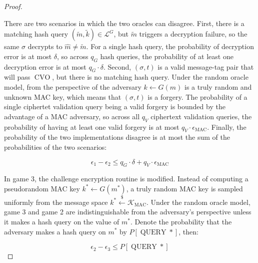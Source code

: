 \documentclass{article}
\newcommand{\leftsample}{\overset{{\scriptscriptstyle\$}}{\leftarrow}}
\newcommand{\pk}{\operatorname{pk}}
\newcommand{\cvo}{\operatorname{CVO}}
\begin{document}
\begin{proof}
\begin{multicols}{2}
        \begin{algorithm}[H]
            \caption{$\cvo_1$}
            \SetAlgoLined
            \If{
                $\exists (\tilde{m}, \tilde{k}) \in \mathcal{L}^G$ s.t.
                $E(\pk, \tilde{m}) = c$ and $V(\tilde{k}, \sigma, t) = 1$
            }{
                \Return{$1$}\;
            }
            \;
        \end{algorithm}
    \end{multicols}

    There are two scenarios in which the two oracles can disagree. First, there is a matching hash query $(\tilde{m}, \tilde{k}) \in \mathcal{L}^G$, but $\tilde{m}$ triggers a decryption failure, so the same $\sigma$ decrypts to $\hat{m} \neq \tilde{m}$. For a single hash query, the probability of decryption error is at most $\delta$, so across $q_G$ hash queries, the probability of at least one decryption error is at most $q_G \cdot \delta$. Second, $(\sigma, t)$ is a valid message-tag pair that will pass $\cvo$, but there is no matching hash query. Under the random oracle model, from the perspective of the adversary $k \leftarrow G(m)$ is a truly random and unknown MAC key, which means that $(\sigma, t)$ is a forgery. The probability of a single ciphertet validation query being a valid forgery is bounded by the advantage of a MAC adversary, so across all $q_V$ ciphertext validation queries, the probability of having at least one valid forgery is at most $q_V\cdot\epsilon_\text{MAC}$. Finally, the probability of the two implementations disagree is at most the sum of the probabilities of the two scenarios:

    \begin{equation*}
        \epsilon_1 - \epsilon_2 \leq q_G \cdot \delta + q_V \cdot \epsilon_\text{MAC}
    \end{equation*}

    In game 3, the challenge encryption routine is modified. Instead of computing a pseudorandom MAC key $k^\ast \leftarrow G(m^\ast)$, a truly random MAC key is sampled uniformly from the message space $k^\ast \leftsample \mathcal{K}_\text{MAC}$. Under the random oracle model, game 3 and game 2 are indistinguishable from the adversary's perspective unless it makes a hash query on the value of $m^\ast$. Denote the probability that the adversary makes a hash query on $m^\ast$ by $P[\operatorname{QUERY}\ast]$, then:

    \begin{equation*}
        \epsilon_2 - \epsilon_3 \leq P[\operatorname{QUERY}\ast]
    \end{equation*}


\end{proof}
\end{document}
